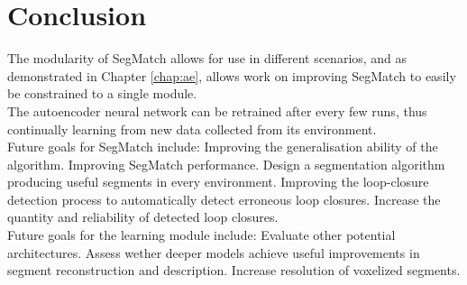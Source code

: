 \chapter{Conclusion}
\label{chap:conclusion}

The modularity of SegMatch allows for use in different scenarios, and as demonstrated in Chapter \ref{chap:ae}, allows work on improving SegMatch to easily be constrained to a single module.\\

The autoencoder neural network can be retrained after every few runs, thus continually learning from new data collected from its environment.\\

Future goals for SegMatch include: Improving the generalisation ability of the algorithm. Improving SegMatch performance. Design a segmentation algorithm producing useful segments in every environment. Improving the loop-closure detection process to automatically detect erroneous loop closures. Increase the quantity and reliability of detected loop closures.\\

Future goals for the learning module include: Evaluate other potential architectures. Assess wether deeper models achieve useful improvements in segment reconstruction and description. Increase resolution of voxelized segments.\\
